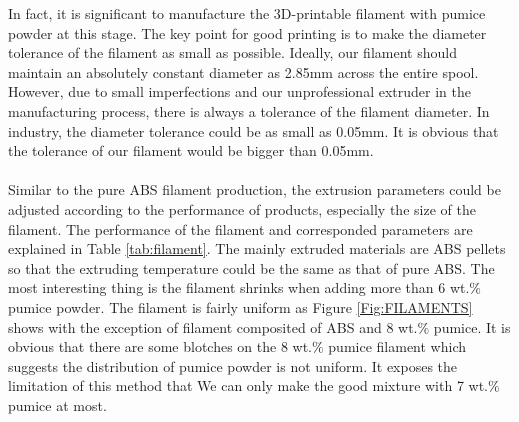 In fact, it is significant to manufacture the 3D-printable filament with pumice powder at this stage. The key point for good printing is to make the diameter tolerance of the filament as small as possible.  Ideally, our filament should maintain an absolutely constant diameter as 2.85mm across the entire spool. However, due to small imperfections and our unprofessional extruder in the manufacturing process, there is always a tolerance of the filament diameter. In industry, the diameter tolerance could be as small as 0.05mm. It is obvious that the tolerance of our filament would be bigger than 0.05mm.\\
\\
Similar to the pure ABS filament production, the extrusion parameters could be adjusted according to the performance of products, especially the size of the filament. The performance of the filament and corresponded parameters are explained in Table \ref{tab:filament}. The mainly extruded materials are ABS pellets so that the extruding temperature could be the same as that of pure ABS. The most interesting thing is the filament shrinks when adding more than 6 wt.$\%$ pumice powder. The filament is fairly uniform as Figure \ref{Fig:FILAMENTS} shows with the exception of filament composited of ABS and 8 wt.$\%$ pumice. It is obvious that there are some blotches on the 8 wt.$\%$ pumice filament which suggests the distribution of pumice powder is not uniform. It exposes the limitation of this method that We can only make the good mixture with 7 wt.$\%$ pumice at most.\\

